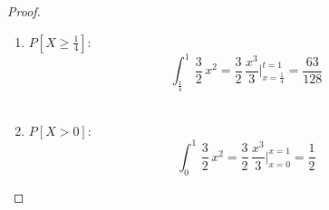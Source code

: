 \documentclass[11pt,letterpaper]{article}
\begin{document}
\begin{proof}
\begin{enumerate}
  \begin{equation*}
      \int_{-\frac{3}{4}}^{\frac{1}{2}}\,\frac{3}{2}\,x^2=\frac{3}{2}\,\frac{x^3}{3}\big|_{x = -\frac{3}{4}}^{t = \frac{1}{2}}=\frac{35}{128}
  \end{equation*}\,\\
  \item $P[X\geq \frac{1}{4}]$:
  \begin{equation*}
    \int_{\frac{1}{4}}^{1}\,\frac{3}{2}\,x^2=\frac{3}{2}\,\frac{x^3}{3}\big|_{x =\frac{1}{4}}^{t = 1}=\frac{63}{128}
  \end{equation*}\,\\
  \item $P[X>0]$:
  \begin{equation*}
    \int_{0}^{1}\,\frac{3}{2}\,x^2=\frac{3}{2}\,\frac{x^3}{3}\big|_{x=0}^{x= 1}=\frac{1}{2}
  \end{equation*}
\end{enumerate}
\end{proof}
\end{document}
